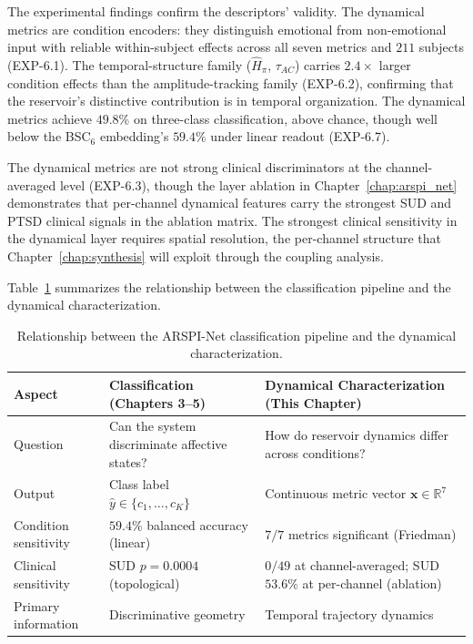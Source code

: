 The experimental findings confirm the descriptors' validity. The dynamical metrics are condition encoders: they distinguish emotional from non-emotional input with reliable within-subject effects across all seven metrics and $211$ subjects (EXP-6.1). The temporal-structure family ($\hat{H}_{\pi}$, $\tau_{AC}$) carries $2.4\times$ larger condition effects than the amplitude-tracking family (EXP-6.2), confirming that the reservoir's distinctive contribution is in temporal organization. The dynamical metrics achieve $49.8\%$ on three-class classification, above chance, though well below the BSC$_6$ embedding's $59.4\%$ under linear readout (EXP-6.7).

The dynamical metrics are not strong clinical discriminators at the channel-averaged level (EXP-6.3), though the layer ablation in Chapter~\ref{chap:arspi_net} demonstrates that per-channel dynamical features carry the strongest SUD and PTSD clinical signals in the ablation matrix. The strongest clinical sensitivity in the dynamical layer requires spatial resolution, the per-channel structure that Chapter~\ref{chap:synthesis} will exploit through the coupling analysis.

Table~\ref{tab:dynamics_relationship_updated} summarizes the relationship between the classification pipeline and the dynamical characterization.

\begin{table}[H]
\centering
\caption{Relationship between the ARSPI-Net classification pipeline and the dynamical characterization.}
\label{tab:dynamics_relationship_updated}
\begin{tabularx}{\textwidth}{>{\raggedright\arraybackslash}p{} >{\raggedright\arraybackslash}X >{\raggedright\arraybackslash}X}
\toprule
\textbf{Aspect} & \textbf{Classification (Chapters 3--5)} & \textbf{Dynamical Characterization (This Chapter)} \\
\midrule
Question & Can the system discriminate affective states? & How do reservoir dynamics differ across conditions? \\
Output & Class label $\hat{y}\in\{c_1,\ldots,c_K\}$ & Continuous metric vector $\mathbf{x}\in\mathbb{R}^7$ \\
Condition sensitivity & $59.4\%$ balanced accuracy (linear) & $7/7$ metrics significant (Friedman) \\
Clinical sensitivity & SUD $p = 0.0004$ (topological) & $0/49$ at channel-averaged; SUD $53.6\%$ at per-channel (ablation) \\
Primary information & Discriminative geometry & Temporal trajectory dynamics \\
\bottomrule
\end{tabularx}
\end{table}


